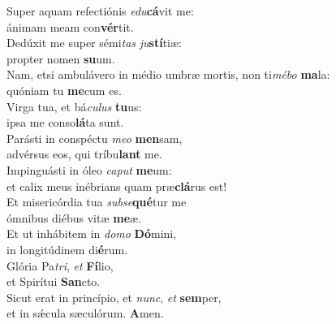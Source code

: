 \evenverse Super aquam refectiónis \textit{e}\textit{du}\textbf{cá}vit me:~\*\\
\evenverse ánimam meam con\textbf{vér}tit.\\
\oddverse Dedúxit me super sémi\textit{tas} \textit{ju}\textbf{stí}tiæ:~\*\\
\oddverse propter nomen \textbf{su}um.\\
\evenverse Nam, etsi ambulávero in médio umbræ mortis, non ti\textit{mé}\textit{bo} \textbf{ma}la:~\*\\
\evenverse quóniam tu \textbf{me}cum es.\\
\oddverse Virga tua, et bá\textit{cu}\textit{lus} \textbf{tu}us:~\*\\
\oddverse ipsa me conso\textbf{lá}ta sunt.\\
\evenverse Parásti in conspéctu \textit{me}\textit{o} \textbf{men}sam,~\*\\
\evenverse advérsus eos, qui tríbu\textbf{lant} me.\\
\oddverse Impinguásti in óleo \textit{ca}\textit{put} \textbf{me}um:~\*\\
\oddverse et calix meus inébrians quam præ\textbf{clá}rus est!\\
\evenverse Et misericórdia tua \textit{sub}\textit{se}\textbf{qué}tur me~\*\\
\evenverse ómnibus diébus vitæ \textbf{me}æ.\\
\oddverse Et ut inhábitem in \textit{do}\textit{mo} \textbf{Dó}mini,~\*\\
\oddverse in longitúdinem di\textbf{é}rum.\\
\evenverse Glória Pa\textit{tri}, \textit{et} \textbf{Fí}lio,~\*\\
\evenverse et Spirítui \textbf{San}cto.\\
\oddverse Sicut erat in princípio, et \textit{nunc}, \textit{et} \textbf{sem}per,~\*\\
\oddverse et in sǽcula sæculórum. \textbf{A}men.\\
